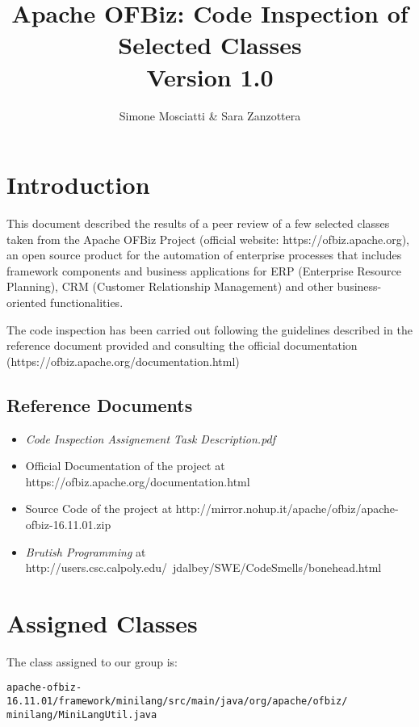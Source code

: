\documentclass[11pt]{article} %
\title{Apache OFBiz: Code Inspection of Selected Classes \\ {\Large Version 1.0}}
\author{Simone Mosciatti \& Sara Zanzottera}
\begin{document}
\maketitle
\newpage
\tableofcontents
\newpage

\section{Introduction}
This document described the results of a peer review of a few selected classes taken from the Apache OFBiz Project (official website: https://ofbiz.apache.org), an open source product for the automation of enterprise processes that includes framework components and business applications for ERP (Enterprise Resource Planning), CRM (Customer Relationship Management) and other business-oriented functionalities.
 
The code inspection has been carried out following the guidelines described in the reference document provided and consulting the official documentation \\ (https://ofbiz.apache.org/documentation.html) 

\subsection{Reference Documents}
\begin{itemize}
	\item \textit{Code Inspection Assignement Task Description.pdf}
	\item Official Documentation of the project at https://ofbiz.apache.org/documentation.html
	\item Source Code of the project at http://mirror.nohup.it/apache/ofbiz/apache-ofbiz-16.11.01.zip
	\item \textit{Brutish Programming} at 
http://users.csc.calpoly.edu/~jdalbey/SWE/CodeSmells/bonehead.html
\end{itemize}


\section{Assigned Classes}

The class assigned to our group is:  
\newline

\texttt{apache-ofbiz-16.11.01/framework/minilang/src/main/java/org/apache/ofbiz/ 
minilang/MiniLangUtil.java}

\hfill\\
\end{document}
